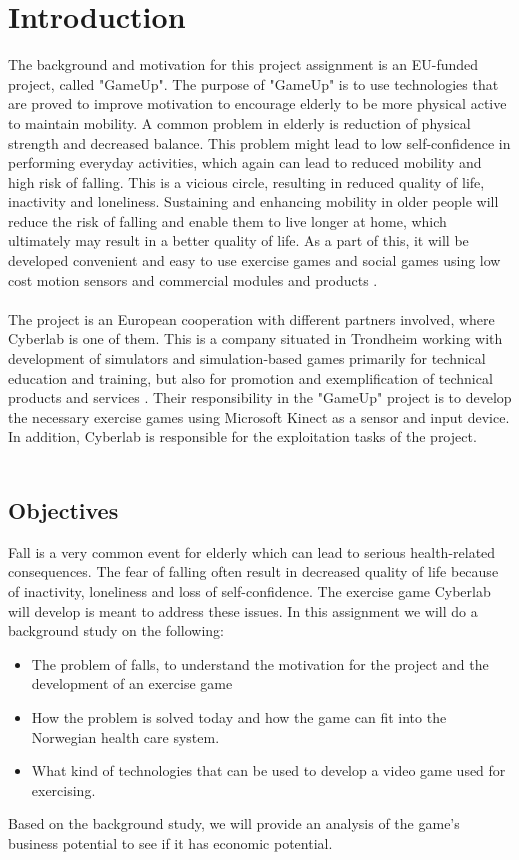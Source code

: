 \chapter{Introduction}
The background and motivation for this project assignment is an EU-funded project, called "GameUp". The purpose of "GameUp" is to use technologies that are proved to improve motivation to encourage elderly to be more physical active to maintain mobility. A common problem in elderly is reduction of physical strength and decreased balance. This problem might lead to low self-confidence in performing everyday activities, which again can lead to reduced mobility and high risk of falling. This is a vicious circle, resulting in reduced quality of life, inactivity and loneliness. Sustaining and enhancing mobility in older people will reduce the risk of falling and enable them to live longer at home, which ultimately may result in a better quality of life. As a part of this, it will be developed convenient and easy to use exercise games and social games using low cost motion sensors and commercial modules and products \cite{gameup}.\\ \\ The project is an European cooperation with different partners involved, where Cyberlab is one of them. This is a company situated in Trondheim working with development of simulators and simulation-based games primarily for technical education and training, but also for promotion and exemplification of technical products and services \cite{cyberlab}. Their responsibility in the "GameUp" project is to develop the necessary exercise games using Microsoft Kinect as a sensor and input device. In addition, Cyberlab is responsible for the exploitation tasks of the project.  \\ \\

\section{Objectives}
Fall is a very common event for elderly which can lead to serious health-related consequences. The fear of falling often result in decreased quality of life because of inactivity, loneliness and loss of self-confidence. The exercise game Cyberlab will develop is meant to address these issues. In this assignment we will do a background study on the following:
\begin{itemize}
\renewcommand{\labelitemi}{$\bullet$}
\item The problem of falls, to understand the motivation for the project and the development of an exercise game 
\item How the problem is solved today and how the game can fit into the Norwegian health care system.
\item What kind of technologies that can be used to develop a video game used for exercising.
\end{itemize}
Based on the background study, we will provide an analysis of the game’s business potential to see if it has economic potential.

